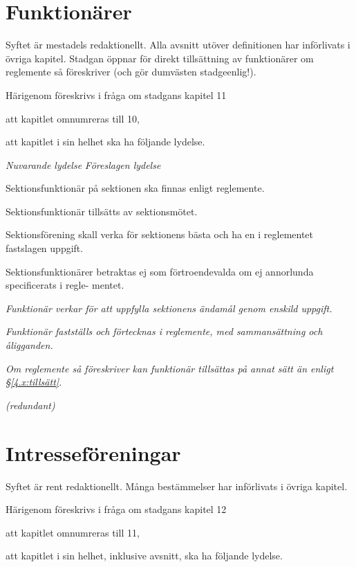 \documentclass{article}
\newenvironment{lydelse}
    {\begin{paracol}{2}%
        \emph{Nuvarande lydelse}%
        \switchcolumn%
        \emph{Föreslagen lydelse}%
    \end{paracol}%
    \begin{enumerate}[label=\thesubsection.\arabic*]%
    \begin{paracol}{2}%
    }{\end{paracol}\end{enumerate}}
\begin{document}
\section{Funktionärer}
Syftet är mestadels redaktionellt.
Alla avsnitt utöver definitionen har införlivats i övriga kapitel.
Stadgan öppnar för direkt tillsättning av funktionärer om reglemente så föreskriver (och gör dumvästen stadgeenlig!).

Härigenom föreskrivs i fråga om stadgans kapitel 11
\begin{dels}
\item att kapitlet omnumreras till 10,
\item att kapitlet i sin helhet ska ha följande lydelse.
\end{dels}

\begin{lydelse}
  \setcounter{section}{11}
  \setcounter{subsection}{1}
\item Sektionsfunktionär på sektionen ska finnas enligt reglemente.
\item Sektionsfunktionär tillsätts av sektionsmötet.
\item Sektionsförening skall verka för sektionens bästa och ha en i reglementet fastslagen uppgift.
\item Sektionsfunktionärer betraktas ej som förtroendevalda om ej annorlunda specificerats i regle-
mentet.
\switchcolumn
\setcounter{section}{10}
\item \emph{Funktionär verkar för att uppfylla sektionens ändamål genom enskild uppgift.}
\item \emph{Funktionär fastställs och förtecknas i reglemente, med sammansättning och åligganden.}
\item \emph{Om reglemente så föreskriver kan funktionär tillsättas på annat sätt än enligt \S\ref{4.x:tillsätt}.}
\item[] \emph{(redundant)}
\end{lydelse}
\setcounter{section}{10}

\section{Intresseföreningar}
Syftet är rent redaktionellt.
Många bestämmelser har införlivats i övriga kapitel.

Härigenom föreskrivs i fråga om stadgans kapitel 12
\begin{dels}
\item att kapitlet omnumreras till 11,
\item att kapitlet i sin helhet, inklusive avsnitt, ska ha följande lydelse.
\end{dels}
\end{document}
